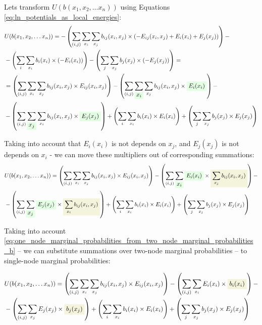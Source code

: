 \documentclass[fleqn,leqno]{article}
\newcommand{\highlight}[1]{\colorbox{green!10}{$\displaystyle#1$}}
\newcommand{\highlightred}[1]{\colorbox{olive!10}{$\displaystyle#1$}}
\begin{document}
Lets transform $U(b(x_1,x_2,\dots x_n))$ using Equations \eqref{eq:ln_potentials_as_local_energies}:
\begin{equation}
\begin{split}
   & U(b(x_1,x_2,\dots x_n)) = -\left( \sum_{(i, j)} \sum_{x_i} \sum_{x_j} b_{ij}(x_i, x_j) \times (-E_{ij}(x_i, x_j) + E_i(x_i) + E_j(x_j)) \right) - \\
   & -\left( \sum_{i} \sum_{x_i} b_i(x_i) \times (-E_i(x_i)) \right) - \left( \sum_{j} \sum_{x_j} b_j(x_j) \times (-E_j(x_j)) \right) = \\
   & = \left( \sum_{(i, j)} \sum_{x_i} \sum_{x_j} b_{ij}(x_i, x_j) \times E_{ij}(x_i, x_j) \right) - \left( \sum_{(i, j)} \sum_{\highlight{x_i}} \sum_{x_j} b_{ij}(x_i, x_j) \times \highlight{E_i(x_i)} \right) - \\
   & -\left( \sum_{(i, j)} \sum_{\highlight{x_j}} \sum_{x_i} b_{ij}(x_i, x_j) \times \highlight{E_j(x_j)} \right) + \left( \sum_{i} \sum_{x_i} b_i(x_i) \times E_i(x_i) \right) + \left( \sum_{j} \sum_{x_j} b_j(x_j) \times E_j(x_j) \right)
\end{split}
\end{equation}

Taking into account that $E_i(x_i)$ is not depends on $x_j$, and $E_j(x_j)$ is not depends on $x_i$ - we can move these multipliers out of corresponding summations:
\begin{equation}
\begin{split}
   & U(b(x_1,x_2,\dots x_n)) = \left( \sum_{(i, j)} \sum_{x_i} \sum_{x_j} b_{ij}(x_i, x_j) \times E_{ij}(x_i, x_j) \right) - \left( \sum_{(i, j)} \sum_{\highlight{x_i}} \highlight{E_i(x_i)} \times \highlightred{\sum_{x_j} b_{ij}(x_i, x_j)} \right) - \\
   & -\left( \sum_{(i, j)} \sum_{\highlight{x_j}} \highlight{E_j(x_j)} \times \highlightred{\sum_{x_i} b_{ij}(x_i, x_j)} \right) + \left( \sum_{i} \sum_{x_i} b_i(x_i) \times E_i(x_i) \right) + \left( \sum_{j} \sum_{x_j} b_j(x_j) \times E_j(x_j) \right)
\end{split}
\end{equation}

Taking into account \eqref{eq:one_node_marginal_probabilities_from_two_node_marginal_probabilities_b} -- we can substitute summations over two-node marginal probabilities -- to single-node marginal probabilities:

\begin{equation}
\begin{split}
   & U(b(x_1,x_2,\dots x_n)) = \left( \sum_{(i, j)} \sum_{x_i} \sum_{x_j} b_{ij}(x_i, x_j) \times E_{ij}(x_i, x_j) \right) - \left( \sum_{(i, j)} \sum_{x_i} E_i(x_i) \times \highlightred{b_i(x_i)} \right) - \\
   & -\left( \sum_{(i, j)} \sum_{x_j} E_j(x_j) \times \highlightred{b_j(x_j)} \right) + \left( \sum_{i} \sum_{x_i} b_i(x_i) \times E_i(x_i) \right) + \left( \sum_{j} \sum_{x_j} b_j(x_j) \times E_j(x_j) \right)
\end{split}
\end{equation}
\end{document}
